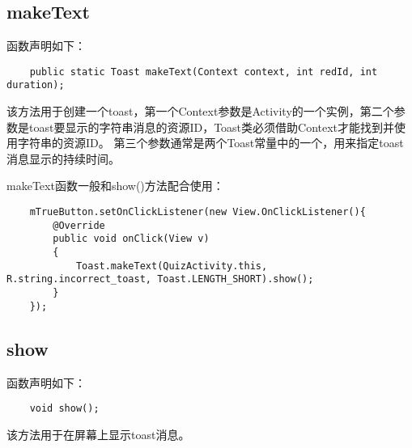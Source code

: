 \documentclass[a4paper,left=2.5cm,right=2.5cm,11pt]{article}
\begin{document}
\subsection{makeText}
	函数声明如下：
	\begin{lstlisting}
	public static Toast makeText(Context context, int redId, int duration);
	\end{lstlisting}

	该方法用于创建一个toast，第一个Context参数是Activity的一个实例，第二个参数是toast要显示的字符串消息的资源ID，Toast类必须借助Context才能找到并使用字符串的资源ID。
	第三个参数通常是两个Toast常量中的一个，用来指定toast消息显示的持续时间。\par

	makeText函数一般和show()方法配合使用：
	\begin{lstlisting}
	mTrueButton.setOnClickListener(new View.OnClickListener(){
		@Override
		public void onClick(View v)
		{
			Toast.makeText(QuizActivity.this, R.string.incorrect_toast, Toast.LENGTH_SHORT).show();
		}
	});
	\end{lstlisting}

\subsection{show}
	函数声明如下：
	\begin{lstlisting}
	void show();
	\end{lstlisting}

	该方法用于在屏幕上显示toast消息。
\end{document}
